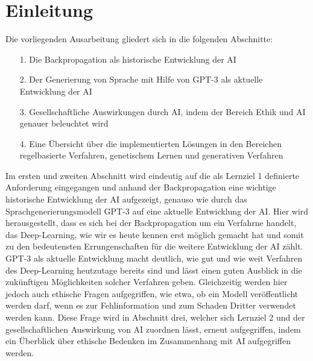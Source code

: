 \chapter{Einleitung}
 Die vorliegenden Ausarbeitung gliedert sich in die folgenden Abschnitte:
 
 \begin{itemize}
 	\item[1.] Die Backpropagation als historische Entwicklung der AI
 	\item[2.] Der Generierung von Sprache mit Hilfe von GPT-3 als aktuelle Entwicklung der AI
 	\item[3.] Gesellschaftliche Auswirkungen durch AI, indem der Bereich Ethik und AI genauer beleuchtet wird
 	\item[4.] Eine Übersicht über die implementierten Lösungen in den Bereichen regelbasierte Verfahren, genetischem Lernen und generativen Verfahren
 \end{itemize}

Im ersten und zweiten Abschnitt wird eindeutig auf die als Lernziel 1 definierte Anforderung eingegangen und anhand der Backpropagation eine wichtige historische Entwicklung der AI aufgezeigt, genauso wie durch das Sprachgenerierungsmodell GPT-3 auf eine aktuelle Entwicklung der AI. Hier wird herausgestellt, dass es sich bei der Backpropagation um ein Verfahrne handelt, das Deep-Learning, wie wir es heute kennen erst möglich gemacht hat und somit zu den bedeutensten Errungenschaften für die weitere Entwicklung der AI zählt. GPT-3 als aktuelle Entwicklung macht deutlich, wie gut und wie weit Verfahren des Deep-Learning heutzutage bereits sind und lässt einen guten Ausblick in die zukünftigen Möglichkeiten solcher Verfahren geben. Gleichzeitig werden hier jedoch auch ethische Fragen aufgegriffen, wie etwa, ob ein Modell veröffentlicht werden darf, wenn es zur Fehlinformation und zum Schaden Dritter verwendet werden kann. Diese Frage wird in Abschnitt drei, welcher sich Lernziel 2 und der gesellschaftlichen Auswirkung von AI zuordnen lässt, erneut aufgegriffen, indem ein Überblick über ethische Bedenken im Zusammenhang mit AI aufgegriffen werden. 